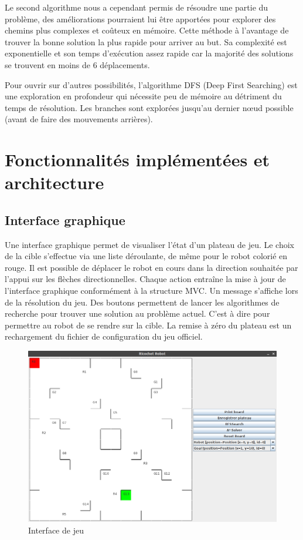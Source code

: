 \documentclass[a4paper]{article} %
\begin{document}
Le second algorithme nous a cependant permis de résoudre une partie du problème, des améliorations pourraient lui être apportées pour explorer des chemins plus complexes et coûteux en mémoire. Cette méthode à l'avantage de trouver la bonne solution la plus rapide pour arriver au but. Sa complexité est exponentielle et son temps d'exécution assez rapide car la majorité des solutions se trouvent en moins de 6 déplacements.

Pour ouvrir sur d'autres possibilités, l'algorithme DFS (Deep First Searching) est une exploration en profondeur qui nécessite peu de mémoire au détriment du temps de résolution. Les branches sont explorées jusqu'au dernier nœud possible (avant de faire des mouvements arrières).

\section{Fonctionnalités implémentées et architecture}
	\subsection{Interface graphique}
	Une interface graphique\up{\ref{interface}} permet de visualiser l'état d'un plateau de jeu. Le choix de la cible s'effectue via une liste déroulante, de même pour le robot colorié en rouge. Il est possible de déplacer le robot en cours dans la direction souhaitée par l'appui sur les flèches directionnelles.
	Chaque action entraîne la mise à jour de l'interface graphique conformément à la structure MVC. Un message s'affiche lors de la résolution du jeu.
	Des boutons permettent de lancer les algorithmes de recherche pour trouver une solution au problème actuel. C'est à dire pour permettre au robot de se rendre sur la cible.
	La remise à zéro du plateau est un rechargement du fichier de configuration du jeu officiel.

\begin{figure}[htpb]
	\begin{center}
	\includegraphics[scale=0.3]{./images/interface.png}
	\caption{Interface de jeu}\label{interface}
	\end{center}
\end{figure}
\end{document}
